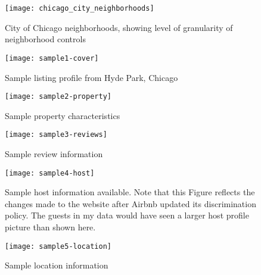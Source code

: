 \documentclass[11pt, oneside]{article}
\begin{document}



\listoftables






















\listoffigures
\begin{figure}
\texttt{[image: chicago\_city\_neighborhoods]}
\caption[City of Chicago neighborhoods]{City of Chicago neighborhoods, showing level of granularity of neighborhood controls}
\end{figure}

\begin{figure}
\texttt{[image: sample1-cover]}
\caption{Sample listing profile from Hyde Park, Chicago}
\end{figure}
\begin{figure}
\texttt{[image: sample2-property]}
\caption{Sample property characteristics}
\end{figure}
\begin{figure}
\texttt{[image: sample3-reviews]}
\caption{Sample review information}
\end{figure}
\begin{figure}
\texttt{[image: sample4-host]}
\caption[Sample host information]{Sample host information available. Note that this Figure reflects the changes made to the website after Airbnb updated its discrimination policy. The guests in my data would have seen a larger host profile picture than shown here.}
\end{figure}
\begin{figure}
\texttt{[image: sample5-location]}
\caption{Sample location information}
\end{figure}
\end{document}
